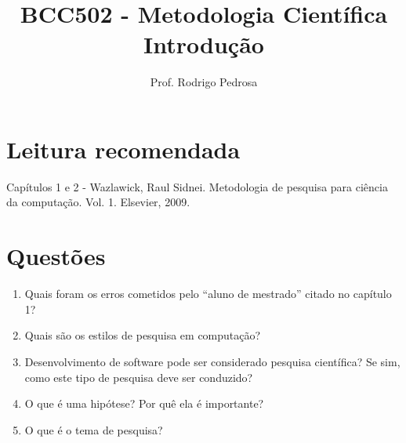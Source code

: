 \documentclass{article}
\title{BCC502 - Metodologia Científica\\ Introdução}
\author{Prof. Rodrigo Pedrosa}
\begin{document}
\maketitle

\section{Leitura recomendada}

Capítulos 1 e 2 - Wazlawick, Raul Sidnei. Metodologia de pesquisa para ciência da computação. Vol. 1. Elsevier, 2009.


\section{Questões}

\begin{enumerate}

    \item Quais foram os erros cometidos pelo ``aluno de mestrado'' citado no capítulo 1?
    
    \item Quais são os estilos de pesquisa em computação?
    
    \item Desenvolvimento de software pode ser considerado pesquisa científica? Se sim, como este tipo de pesquisa deve ser conduzido?
    
    \item O que é uma hipótese? Por quê ela é importante?
    
    \item O que é o tema de pesquisa?
    
\end{enumerate}
    
%
%
\end{document}

